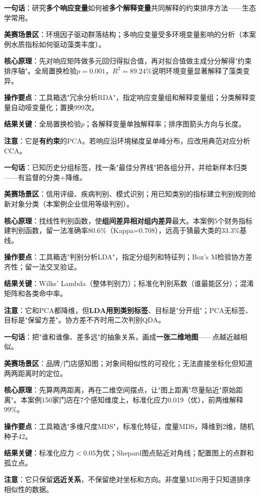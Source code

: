 \begin{algobrief}
\textbf{一句话}：研究\textbf{多个响应变量}如何被\textbf{多个解释变量}共同解释的约束排序方法——生态学常用。

\textbf{美赛场景区}：环境因子驱动群落结构；多响应变量受多环境变量影响的分析（本案例水质指标如何驱动藻类丰度）。

\textbf{核心原理}：先对响应矩阵做多元回归得拟合值，再对拟合值做主成分分解得"约束排序轴"。全局置换检验$p=0.001$，$R^2=89.24\%$说明环境变量显著解释了藻类变异。

\textbf{操作要点}：工具箱选"冗余分析RDA"，指定响应变量组和解释变量组；分类解释变量自动哑变量化；置换999次。

\textbf{结果关键}：全局置换检验$p$；各解释变量单独解释率；排序图箭头方向与长度。

\textbf{注意}：它是\textbf{有约束}的PCA。若响应沿环境梯度呈单峰分布，应改用典范对应分析CCA。
\end{algobrief}


\begin{algobrief}
\textbf{一句话}：已知历史分组标签，找一条"最佳分界线"把各组分开，并给新样本归类——有监督的分类+降维。

\textbf{美赛场景区}：信用评级、疾病判别、模式识别；用已知类别的指标建立判别规则给新对象分类（本案例企业信用等级判别）。

\textbf{核心原理}：找线性判别函数，使\textbf{组间差异相对组内差异}最大。本案例5个财务指标建判别函数，留一法准确率80.6\%（Kappa=0.708），远高于猜最大类的33.3\%基线。

\textbf{操作要点}：工具箱选"判别分析LDA"，指定分组列和特征列；Box's M检验协方差齐性；留一法交叉验证。

\textbf{结果关键}：Wilks' Lambda（整体判别力）；标准化判别系数（谁最能区分）；混淆矩阵和各类命中率。

\textbf{注意}：它和PCA都降维，但\textbf{LDA用到类别标签}、目标是"分开组"；PCA无标签、目标是"保留方差"。协方差不齐时用二次判别QDA。
\end{algobrief}


\begin{algobrief}
\textbf{一句话}：把"谁和谁像、差多远"的抽象关系，画成\textbf{一张二维地图}——点越近越相似。

\textbf{美赛场景区}：品牌/门店感知图；对象间相似性的可视化；无法直接坐标化但知道两两距离时的定位。

\textbf{核心原理}：先算两两距离，再在二维空间摆点，让"图上距离"尽量贴近"原始距离"。本案例150家门店在7个感知维度上，标准化应力0.019（优），前两维解释99\%。

\textbf{操作要点}：工具箱选"多维尺度MDS"，标准化特征，度量MDS，降维到2维，随机种子42。

\textbf{结果关键}：标准化应力$<0.05$为优；Shepard图点贴近对角线；配置图上的点群和孤立点。

\textbf{注意}：它只保留\textbf{远近关系}，不保留绝对坐标和方向。非度量MDS用于只知道排序相似性的数据。
\end{algobrief}

